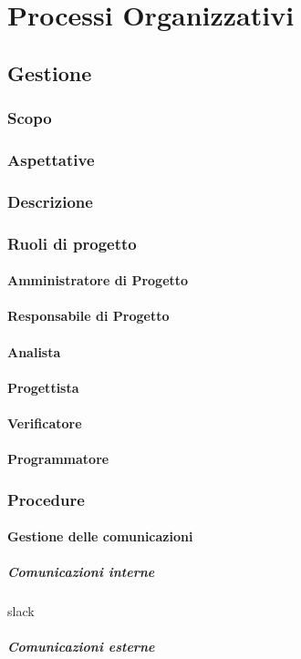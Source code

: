 \section{Processi Organizzativi}


\subsection{Gestione}

	\subsubsection{Scopo}
	\subsubsection{Aspettative}
	\subsubsection{Descrizione}
	\subsubsection{Ruoli di progetto}
		\paragraph{Amministratore di Progetto}
		\paragraph{Responsabile di Progetto}
		\paragraph{Analista}
		\paragraph{Progettista}
		\paragraph{Verificatore}
		\paragraph{Programmatore}
	\subsubsection{Procedure}
		\paragraph{Gestione delle comunicazioni}
			\subparagraph{Comunicazioni interne}
			slack
			\subparagraph{Comunicazioni esterne}
